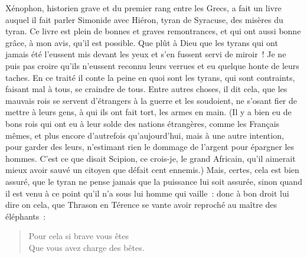 \documentclass[french,twoside]{book} %
\begin{document}
Xénophon, historien grave et du premier rang entre les Grecs, a fait un livre auquel il fait parler Simonide avec Hiéron, tyran de Syracuse, des misères du tyran. Ce livre est plein de bonnes et graves remontrances, et qui ont aussi bonne grâce, à mon avis, qu’il est possible. Que plût à Dieu que les tyrans qui ont jamais été l’eussent mis devant les yeux et s’en fussent servi de miroir ! Je ne puis pas croire qu’ils n’eussent reconnu leurs verrues et eu quelque honte de leurs taches. En ce traité il conte la peine en quoi sont les tyrans, qui sont contraints, faisant mal à tous, se craindre de tous. Entre autres choses, il dit cela, que les mauvais rois se servent d’étrangers à la guerre et les soudoient, ne s’osant fier de mettre à leurs gens, à qui ils ont fait tort, les armes en main. (Il y a bien eu de bons rois qui ont eu à leur solde des nations étrangères, comme les Français mêmes, et plus encore d’autrefois qu’aujourd’hui, mais à une autre intention, pour garder des leurs, n’estimant rien le dommage de l’argent pour épargner les hommes. C’est ce que disait Scipion, ce crois-je, le grand Africain, qu’il aimerait mieux avoir sauvé un citoyen que défait cent ennemis.) Mais, certes, cela est bien assuré, que le tyran ne pense jamais que la puissance lui soit assurée, sinon quand il est venu à ce point qu’il n’a sous lui homme qui vaille : donc à bon droit lui dire on cela, que Thrason en Térence se vante avoir reproché au maître des éléphants :\par


\begin{verse}
Pour cela si brave vous êtes\\
Que vous avez charge des bêtes.\\
\end{verse}
\end{document}
